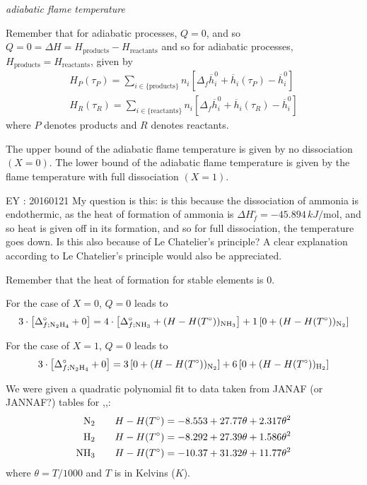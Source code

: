 \documentclass[10pt]{amsart}
\begin{document}
\begin{multicols*}{2}
\emph{adiabatic flame temperature}

Remember that for adiabatic processes, $Q=0$, and so $Q=0=\Delta H = H_{\text{products}} - H_{\text{reactants}}$ and so for adiabatic processes, $H_{\text{products}} = H_{\text{reactants}}$, given by 
\begin{equation}
\begin{aligned}
  H_P(\tau_P) = \sum_{i\in \lbrace \text{products}\rbrace } n_i \left[ \Delta_f \overline{h}_i^0 + \overline{h}_i(\tau_P) - \overline{h}_i^0 \right]   \\
  H_R(\tau_R) = \sum_{i\in \lbrace \text{reactants} \rbrace } n_i \left[ \Delta_f \overline{h}_i^0 + \overline{h}_i(\tau_R) - \overline{h}_i^0 \right]
\end{aligned}
\end{equation}
where $P$ denotes products and $R$ denotes reactants.  

The upper bound of the adiabatic flame temperature is given by no dissociation $(X=0)$.  The lower bound of the adiabatic flame temperature is given by the flame temperature with full dissociation $(X=1)$.  

EY : 20160121 My question is this: is this because the dissociation of ammonia is endothermic, as the heat of formation of ammonia is $\Delta H_f^{\circ} = -45.894 \, kJ/\text{mol}$, and so heat is given off in its formation, and so for full dissociation, the temperature goes down.  Is this also because of Le Chatelier's principle?  A clear explanation according to Le Chatelier's principle would also be appreciated.

Remember that the heat of formation for stable elements is $0$.  

For the case of $X=0$, $Q=0$ leads to
\[
\begin{gathered}
  3 \cdot \left[ \Delta_{f;\ce{N2H4}}^{\circ} + 0 \right] = 4 \cdot \left[ \Delta_{f;\ce{NH3}}^{\circ} + (H-H(T^{\circ}))_{\ce{NH3} }  \right]+ 1 \left[ 0 + (H-H(T^{\circ}))_{\ce{N2}} \right]
\end{gathered}
\]

For the case of $X=1$, $Q=0$ leads to
\[
\begin{gathered}
  3 \cdot \left[ \Delta_{f;\ce{N2H4}}^{\circ} + 0 \right] =  3 \left[ 0 + (H-H(T^{\circ}))_{\ce{N2}} \right] +  6 \left[ 0 + (H-H(T^{\circ}))_{\ce{H2}} \right]
\end{gathered}
\]

We were given a quadratic polynomial fit to data taken from JANAF (or JANNAF?) tables for ,,:
\[
\begin{aligned}
  \ce{N2} \qquad  & H-H(T^{\circ}) = -8.553 + 27.77 \theta + 2.317 \theta^2 \\  
  \ce{H2} \qquad  & H-H(T^{\circ}) = -8.292 + 27.39 \theta + 1.586 \theta^2 \\ 
  \ce{NH3} \qquad & H-H(T^{\circ}) = -10.37 + 31.32 \theta + 11.77 \theta^2
\end{aligned}
\]
where $\theta = T/1000$ and $T$ is in Kelvins ($K$).  


\end{multicols*}
\end{document}
